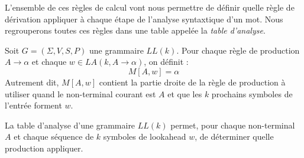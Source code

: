L'ensemble de ces règles de calcul vont nous permettre de définir quelle règle de dérivation appliquer à chaque 
étape de l'analyse syntaxtique d'un mot. Nous regrouperons toutes ces règles dans une table appelée la 
\emph{table d'analyse}. 

\begin{definition}
     Soit $G = ( \Sigma, V, S, P)$ une grammaire $LL(k)$. Pour chaque règle de 
     production $A \longrightarrow \alpha$ et chaque $w \in LA(k, A \longrightarrow \alpha)$, on définit : 
        \[ M[A, w] = \alpha \] 
    Autrement dit, $ M[A,w]$ contient la partie droite de la règle de production à utiliser quand le non-terminal 
    courant est $A$ et que les $k$ prochains symboles de l'entrée forment $w$. 
\end{definition}

La table d’analyse d’une grammaire $LL(k)$ permet, pour chaque non-terminal $A$ et chaque séquence de 
$k$ symboles de lookahead $w$, de déterminer quelle production appliquer.


